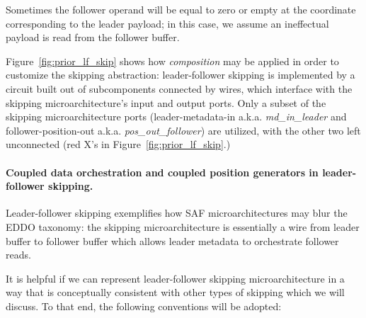 Sometimes the follower operand will be equal to zero or empty at the coordinate corresponding to the leader payload; in this case, we assume an ineffectual payload is read from the follower buffer.

Figure~\ref{fig:prior_lf_skip} shows how \textit{composition} may be applied in order to customize the skipping abstraction: leader-follower skipping is implemented by a circuit built out of subcomponents connected by wires, which interface with the skipping microarchitecture's input and output ports. Only a subset of the skipping microarchitecture ports (leader-metadata-in a.k.a. \textit{md\_in\_leader} and follower-position-out a.k.a. \textit{pos\_out\_follower}) are utilized, with the other two left unconnected (red X's in Figure~\ref{fig:prior_lf_skip}.)

\paragraph{Coupled data orchestration and coupled position generators in leader-follower skipping.}

Leader-follower skipping exemplifies how SAF microarchitectures may blur the EDDO taxonomy: the skipping microarchitecture is essentially a wire from leader buffer to follower buffer which allows leader metadata to orchestrate follower reads.

It is helpful if we can represent leader-follower skipping microarchitecture in a way that is conceptually consistent with other types of skipping which we will discuss. To that end, the following conventions will be adopted:

